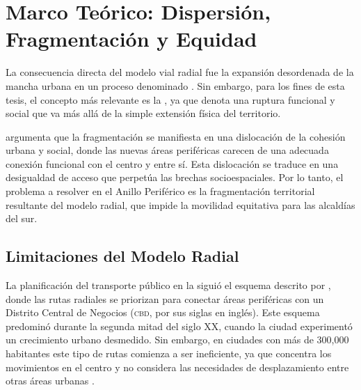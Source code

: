 
\section{Marco Teórico: Dispersión, Fragmentación y Equidad}
\label{sec:marco-teorico-dispersion}

La consecuencia directa del modelo vial radial fue la expansión desordenada de
la mancha urbana en un proceso denominado . Sin embargo,
para los fines de esta tesis, el concepto más relevante es la
, ya que denota una ruptura funcional y social que
va más allá de la simple extensión física del territorio.

\citet{padilla2007} argumenta que la fragmentación se manifiesta en una
dislocación de la cohesión urbana y social, donde las nuevas áreas periféricas
carecen de una adecuada conexión funcional con el centro y entre sí. Esta
dislocación se traduce en una desigualdad de acceso que perpetúa las brechas
socioespaciales. Por lo tanto, el problema a resolver en el Anillo Periférico es
la fragmentación territorial resultante del modelo radial, que impide la
movilidad equitativa para las alcaldías del sur.

\subsection{Limitaciones del Modelo Radial}
\label{subsec:limitaciones-radial}

La planificación del transporte público en la \cdmx{} siguió el esquema descrito
por \citet{molinero2002}, donde las rutas radiales se priorizan para conectar
áreas periféricas con un Distrito Central de Negocios (\textsc{cbd}, por sus
siglas en inglés). Este esquema predominó durante la segunda mitad del siglo XX,
cuando la ciudad experimentó un crecimiento urbano desmedido. Sin embargo, en
ciudades con más de 300,000 habitantes este tipo de rutas comienza a ser
ineficiente, ya que concentra los movimientos en el centro y no considera las
necesidades de desplazamiento entre otras áreas urbanas \citep{molinero2002}.


